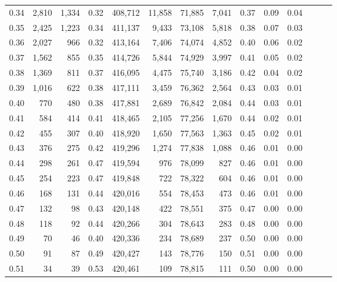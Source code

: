 \begin{tabular}{rrrrrrrrrrrrrr}
0.34 &   2,810 &  1,334 &  0.32 &  408,712 &   11,858 &  71,885 &   7,041 &  0.37 &  0.09 &      0.04 \\
0.35 &   2,425 &  1,223 &  0.34 &  411,137 &    9,433 &  73,108 &   5,818 &  0.38 &  0.07 &      0.03 \\
0.36 &   2,027 &    966 &  0.32 &  413,164 &    7,406 &  74,074 &   4,852 &  0.40 &  0.06 &      0.02 \\
0.37 &   1,562 &    855 &  0.35 &  414,726 &    5,844 &  74,929 &   3,997 &  0.41 &  0.05 &      0.02 \\
0.38 &   1,369 &    811 &  0.37 &  416,095 &    4,475 &  75,740 &   3,186 &  0.42 &  0.04 &      0.02 \\
0.39 &   1,016 &    622 &  0.38 &  417,111 &    3,459 &  76,362 &   2,564 &  0.43 &  0.03 &      0.01 \\
0.40 &     770 &    480 &  0.38 &  417,881 &    2,689 &  76,842 &   2,084 &  0.44 &  0.03 &      0.01 \\
0.41 &     584 &    414 &  0.41 &  418,465 &    2,105 &  77,256 &   1,670 &  0.44 &  0.02 &      0.01 \\
0.42 &     455 &    307 &  0.40 &  418,920 &    1,650 &  77,563 &   1,363 &  0.45 &  0.02 &      0.01 \\
0.43 &     376 &    275 &  0.42 &  419,296 &    1,274 &  77,838 &   1,088 &  0.46 &  0.01 &      0.00 \\
0.44 &     298 &    261 &  0.47 &  419,594 &      976 &  78,099 &     827 &  0.46 &  0.01 &      0.00 \\
0.45 &     254 &    223 &  0.47 &  419,848 &      722 &  78,322 &     604 &  0.46 &  0.01 &      0.00 \\
0.46 &     168 &    131 &  0.44 &  420,016 &      554 &  78,453 &     473 &  0.46 &  0.01 &      0.00 \\
0.47 &     132 &     98 &  0.43 &  420,148 &      422 &  78,551 &     375 &  0.47 &  0.00 &      0.00 \\
0.48 &     118 &     92 &  0.44 &  420,266 &      304 &  78,643 &     283 &  0.48 &  0.00 &      0.00 \\
0.49 &      70 &     46 &  0.40 &  420,336 &      234 &  78,689 &     237 &  0.50 &  0.00 &      0.00 \\
0.50 &      91 &     87 &  0.49 &  420,427 &      143 &  78,776 &     150 &  0.51 &  0.00 &      0.00 \\
0.51 &      34 &     39 &  0.53 &  420,461 &      109 &  78,815 &     111 &  0.50 &  0.00 &      0.00 \\

\end{tabular}
